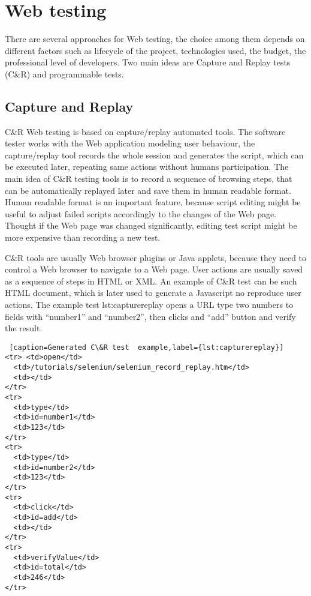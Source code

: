 	\chapter{Web testing}
	\label{ch:Webtesting}

		There are several approaches for Web testing, the choice among them depends on
		different factors such as lifecycle of the project, technologies used, the
		budget, the professional level of developers. Two main ideas are Capture and
		Replay tests (C\&R) and programmable tests.
		
		\section{Capture and Replay}
		\label{sec:captureReplay}
			C\&R Web testing is based on capture/replay automated
			tools\cite{CaptureReplay7}.  The software tester works with the Web
			application modeling user behaviour, the capture/replay tool records the
			whole session and generates the script, which can be executed later,
			repeating same actions without humans participation. The main idea of C\&R
			testing tools is to record a sequence of browsing steps, that can be
			automatically replayed later and save them in human readable format. Human
			readable format is an important feature, because script editing might
			 be useful to adjust failed scripts accordingly	to the changes of the Web page. Thought if the Web page was changed
			significantly, editing test script might be more expensive than recording a
			new test\cite{AnupamCaptureReplay}. 
			
			C\&R tools are usually Web browser plugins or Java applets, because they
			need to control a Web browser to navigate to a Web page. User actions are
			usually saved as a sequence of steps in HTML or XML. An example of C\&R
			test can be such HTML document, which is later used to generate a
			Javascript no reproduce user actions. The example test {lst:capturereplay}
			opens a URL type two numbers to fields with ``number1'' and ``number2'', then
			clicks and ``add'' button and verify the result.

\lstset{style=console}
\begin{lstlisting} [caption=Generated C\&R test  example,label={lst:capturereplay}]
<tr> <td>open</td>
  <td>/tutorials/selenium/selenium_record_replay.htm</td>
  <td></td>
</tr>
<tr>
  <td>type</td>
  <td>id=number1</td>
  <td>123</td>
</tr>
<tr>
  <td>type</td>
  <td>id=number2</td>
  <td>123</td>
</tr>
<tr>
  <td>click</td>
  <td>id=add</td>
  <td></td>
</tr>
<tr>
  <td>verifyValue</td>
  <td>id=total</td>
  <td>246</td>
</tr>
\end{lstlisting}
      
